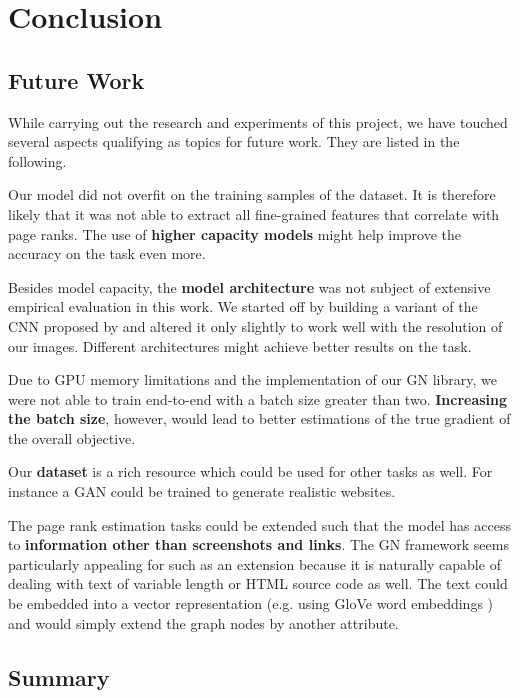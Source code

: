 \section{Conclusion}

\subsection{Future Work}

While carrying out the research and experiments of this project, we have touched several aspects qualifying as topics for future work. They are listed in the following.

Our model did not overfit on the training samples of the dataset. It is therefore likely that it was not able to extract all fine-grained features that correlate with page ranks. The use of \textbf{higher capacity models} might help improve the accuracy on the task even more.

Besides model capacity, the \textbf{model architecture} was not subject of extensive empirical evaluation in this work. We started off by building a variant of the CNN proposed by \cite{beltramelli:pix2code} and altered it only slightly to work well with the resolution of our images. Different architectures might achieve better results on the task.

Due to GPU memory limitations and the implementation of our GN library, we were not able to train end-to-end with a batch size greater than two. \textbf{Increasing the batch size}, however, would lead to better estimations of the true gradient of the overall objective.

Our \textbf{dataset} is a rich resource which could be used for other tasks as well. For instance a GAN \cite{goodfellow2014generative} could be trained to generate realistic websites.

The page rank estimation tasks could be extended such that the model has access to \textbf{information other than screenshots and links}. The GN framework seems particularly appealing for such as an extension because it is naturally capable of dealing with text of variable length or HTML source code as well. The text could be embedded into a vector representation (e.g. using GloVe word embeddings \cite{pennington2014:glove}) and would simply extend the graph nodes by another attribute.

\subsection{Summary}

